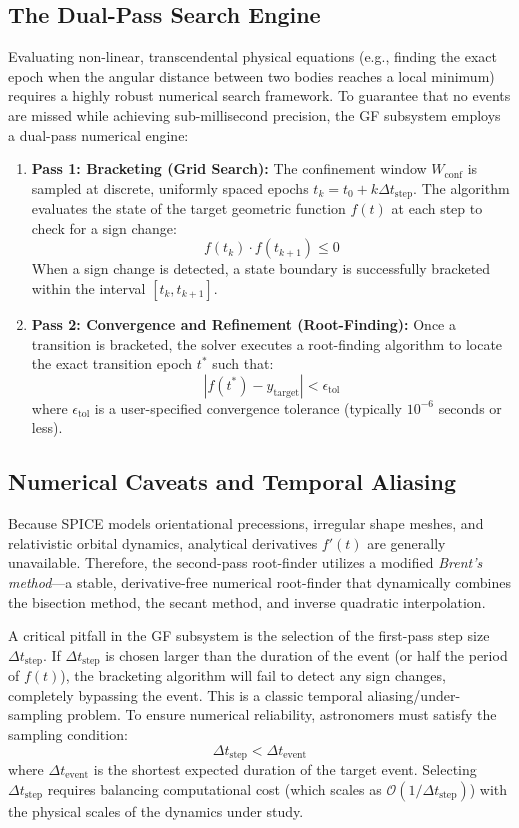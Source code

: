 \documentclass{acta}
\begin{document}
\subsection{The Dual-Pass Search Engine}
Evaluating non-linear, transcendental physical equations (e.g., finding the exact epoch when the angular distance between two bodies reaches a local minimum) requires a highly robust numerical search framework. To guarantee that no events are missed while achieving sub-millisecond precision, the GF subsystem employs a dual-pass numerical engine:
\begin{enumerate}
\item {\bf Pass 1: Bracketing (Grid Search):} The confinement window $W_{\text{conf}}$ is sampled at discrete, uniformly spaced epochs $t_k = t_0 + k \Delta t_{\text{step}}$. The algorithm evaluates the state of the target geometric function $f(t)$ at each step to check for a sign change:
\begin{equation}
f(t_k) \cdot f(t_{k+1}) \leq 0
\end{equation}
When a sign change is detected, a state boundary is successfully bracketed within the interval $[t_k, t_{k+1}]$.
\item {\bf Pass 2: Convergence and Refinement (Root-Finding):} Once a transition is bracketed, the solver executes a root-finding algorithm to locate the exact transition epoch $t^*$ such that:
\begin{equation}
|f(t^*) - y_{\text{target}}| < \epsilon_{\text{tol}}
\end{equation}
where $\epsilon_{\text{tol}}$ is a user-specified convergence tolerance (typically $10^{-6}$ seconds or less).
\end{enumerate}

\subsection{Numerical Caveats and Temporal Aliasing}
Because SPICE models orientational precessions, irregular shape meshes, and relativistic orbital dynamics, analytical derivatives $f'(t)$ are generally unavailable. Therefore, the second-pass root-finder utilizes a modified {\it Brent's method}---a stable, derivative-free numerical root-finder that dynamically combines the bisection method, the secant method, and inverse quadratic interpolation. 

A critical pitfall in the GF subsystem is the selection of the first-pass step size $\Delta t_{\text{step}}$. If $\Delta t_{\text{step}}$ is chosen larger than the duration of the event (or half the period of $f(t)$), the bracketing algorithm will fail to detect any sign changes, completely bypassing the event. This is a classic temporal aliasing/under-sampling problem. To ensure numerical reliability, astronomers must satisfy the sampling condition:
\begin{equation}
\Delta t_{\text{step}} < \Delta t_{\text{event}}
\end{equation}
where $\Delta t_{\text{event}}$ is the shortest expected duration of the target event. Selecting $\Delta t_{\text{step}}$ requires balancing computational cost (which scales as $\mathcal{O}(1/\Delta t_{\text{step}})$) with the physical scales of the dynamics under study.
\end{document}
